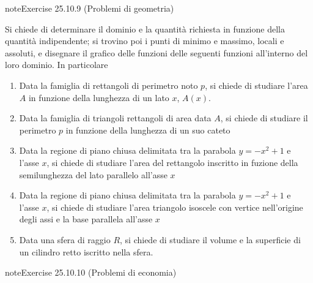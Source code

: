 \documentclass[letterpaper,10pt,italian]{jupyterBook}
\begin{document}
\begin{sphinxadmonition}{note}{Exercise 25.10.9 (Problemi di geometria)}



\sphinxAtStartPar
Si chiede di determinare il dominio e la quantità richiesta in funzione della quantità indipendente; si trovino poi i punti di minimo e massimo, locali e assoluti, e disegnare il grafico delle funzioni delle seguenti funzioni all’interno del loro dominio. In particolare
\begin{enumerate}
%
\item {} 
\sphinxAtStartPar
Data la famiglia di rettangoli di perimetro noto \(p\), si chiede di studiare l’area \(A\) in funzione della lunghezza di un lato \(x\), \(A(x)\).

\item {} 
\sphinxAtStartPar
Data la famiglia di triangoli rettangoli di area data \(A\), si chiede di studiare il perimetro \(p\) in funzione della lunghezza di un suo cateto

\item {} 
\sphinxAtStartPar
Data la regione di piano chiusa delimitata tra la parabola \(y = -x^2+1\) e l’asse \(x\), si chiede di studiare l’area del rettangolo inscritto in fuzione della semi\sphinxhyphen{}lunghezza del lato parallelo all’asse \(x\)

\item {} 
\sphinxAtStartPar
Data la regione di piano chiusa delimitata tra la parabola \(y = -x^2+1\) e l’asse \(x\), si chiede di studiare l’area triangolo isoscele con vertice nell’origine degli assi e la base parallela all’asse \(x\)

\item {} 
\sphinxAtStartPar
Data una sfera di raggio \(R\), si chiede di studiare il volume e la superficie di un cilindro retto iscritto nella sfera.

\end{enumerate}
\end{sphinxadmonition}
 \label{exercise:ch/infinitesimal_calculus/derivatives-problems-exercise-9}

\begin{sphinxadmonition}{note}{Exercise 25.10.10 (Problemi di economia)}



\sphinxAtStartPar
{}
\end{sphinxadmonition}
\end{document}
